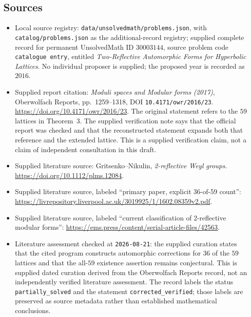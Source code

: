 \documentclass[11pt]{article}
\begin{document}
\subsection{Sources}
\begin{itemize}
\item Local source registry: \texttt{data/unsolvedmath/problems.json}, with \texttt{catalog/problems.json} as the additional-record registry; supplied complete record for permanent UnsolvedMath ID \(30003144\), source problem code \texttt{catalogue entry}, entitled \emph{Two-Reflective Automorphic Forms for Hyperbolic Lattices}. No individual proposer is supplied; the proposed year is recorded as \(2016\).
\item Supplied report citation: \emph{Moduli spaces and Modular forms (2017)}, Oberwolfach Reports, pp.~1259--1318, DOI \texttt{10.4171/owr/2016/23}. \url{https://doi.org/10.4171/owr/2016/23}. The original statement refers to the \(59\) lattices in Theorem~3. The supplied verification note says that the official report was checked and that the reconstructed statement expands both that reference and the extended lattice. This is a supplied verification claim, not a claim of independent consultation in this draft.
\item Supplied literature source: Gritsenko--Nikulin, \emph{2-reflective Weyl groups}. \url{https://doi.org/10.1112/plms.12084}.
\item Supplied literature source, labeled ``primary paper, explicit 36-of-59 count'': \url{https://livrepository.liverpool.ac.uk/3019925/1/1602.08359v2.pdf}.
\item Supplied literature source, labeled ``current classification of 2-reflective modular forms'': \url{https://ems.press/content/serial-article-files/42563}.
\item Literature assessment checked at \texttt{2026-08-21}: the supplied curation states that the cited program constructs automorphic corrections for \(36\) of the \(59\) lattices and that the all-\(59\) existence assertion remains conjectural. This is supplied dated curation derived from the Oberwolfach Reports record, not an independently verified literature assessment. The record labels the status \texttt{partially\_solved} and the statement \texttt{corrected\_verified}; those labels are preserved as source metadata rather than established mathematical conclusions.
\end{itemize}
\end{document}

